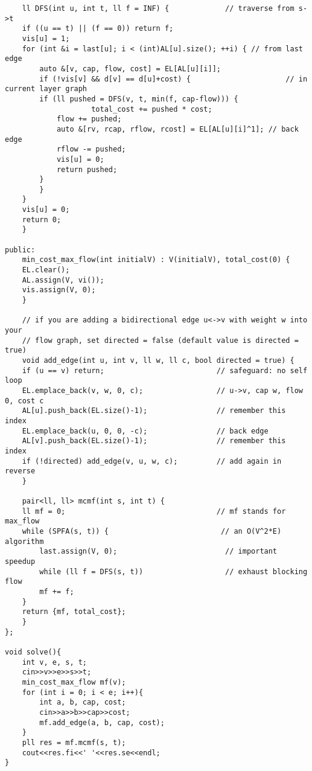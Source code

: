 \documentclass{article}
\begin{document}
\begin{multicols}{2}
\begin{lstlisting}
	ll DFS(int u, int t, ll f = INF) {             // traverse from s->t
	if ((u == t) || (f == 0)) return f;
	vis[u] = 1;
	for (int &i = last[u]; i < (int)AL[u].size(); ++i) { // from last edge
		auto &[v, cap, flow, cost] = EL[AL[u][i]];
		if (!vis[v] && d[v] == d[u]+cost) {                      // in current layer graph
		if (ll pushed = DFS(v, t, min(f, cap-flow))) {
					total_cost += pushed * cost;
			flow += pushed;
			auto &[rv, rcap, rflow, rcost] = EL[AL[u][i]^1]; // back edge
			rflow -= pushed;
			vis[u] = 0;
			return pushed;
		}
		}
	}
	vis[u] = 0;
	return 0;
	}

public:
	min_cost_max_flow(int initialV) : V(initialV), total_cost(0) {
	EL.clear();
	AL.assign(V, vi());
	vis.assign(V, 0);
	}

	// if you are adding a bidirectional edge u<->v with weight w into your
	// flow graph, set directed = false (default value is directed = true)
	void add_edge(int u, int v, ll w, ll c, bool directed = true) {
	if (u == v) return;                          // safeguard: no self loop
	EL.emplace_back(v, w, 0, c);                 // u->v, cap w, flow 0, cost c
	AL[u].push_back(EL.size()-1);                // remember this index
	EL.emplace_back(u, 0, 0, -c);                // back edge
	AL[v].push_back(EL.size()-1);                // remember this index
	if (!directed) add_edge(v, u, w, c);         // add again in reverse
	}

	pair<ll, ll> mcmf(int s, int t) {
	ll mf = 0;                                   // mf stands for max_flow
	while (SPFA(s, t)) {                          // an O(V^2*E) algorithm
		last.assign(V, 0);                         // important speedup
		while (ll f = DFS(s, t))                   // exhaust blocking flow
		mf += f;
	}
	return {mf, total_cost};
	}
};

void solve(){
	int v, e, s, t;
	cin>>v>>e>>s>>t;
	min_cost_max_flow mf(v);
	for (int i = 0; i < e; i++){
		int a, b, cap, cost;
		cin>>a>>b>>cap>>cost;
		mf.add_edge(a, b, cap, cost);
	}
	pll res = mf.mcmf(s, t);
	cout<<res.fi<<' '<<res.se<<endl;
}	
\end{lstlisting}


\end{multicols}
\end{document}

